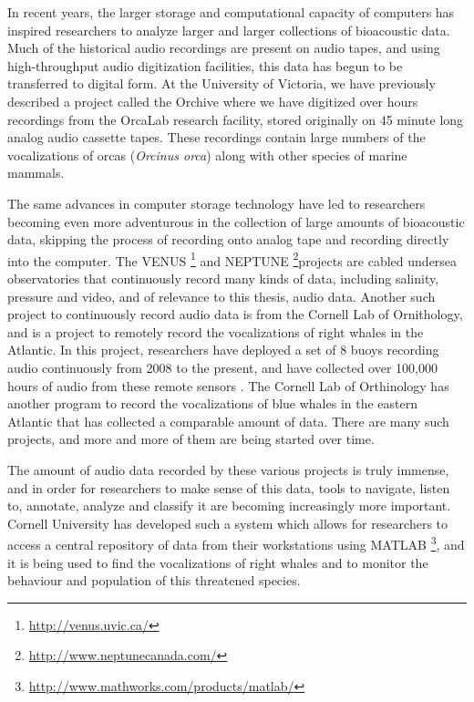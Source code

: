 \documentclass[12pt,oneside]{book}
\begin{document}
In recent years, the larger storage and computational capacity of
computers has inspired researchers to analyze larger and larger
collections of bioacoustic data.  Much of the historical audio
recordings are present on audio tapes, and using high-throughput audio
digitization facilities, this data has begun to be transferred to
digital form.  At the University of Victoria, we have previously
described a project called the Orchive \cite{ness2013orchive} where we
have digitized over \aboutNumberOfOrchiveRecordings hours recordings
from the OrcaLab research facility, stored originally on 45 minute
long analog audio cassette tapes.  These recordings contain large
numbers of the vocalizations of orcas (\textit{Orcinus orca}) along
with other species of marine mammals.

The same advances in computer storage technology have led to
researchers becoming even more adventurous in the collection of large
amounts of bioacoustic data, skipping the process of recording onto
analog tape and recording directly into the computer. The
VENUS \footnote{\url{http://venus.uvic.ca/}} and
NEPTUNE \footnote{\url{http://www.neptunecanada.com/}}projects are
cabled undersea observatories that continuously record many kinds of
data, including salinity, pressure and video, and of relevance to this
thesis, audio data.  Another such project to continuously record audio
data is from the Cornell Lab of Ornithology, and is a project to
remotely record the vocalizations of right whales in the Atlantic.  In
this project, researchers have deployed a set of 8 buoys recording
audio continuously from 2008 to the present, and have collected over
100,000 hours of audio from these remote sensors
\cite{urazghildiiev2009rightwhale}.  The Cornell Lab of Orthinology
has another program to record the vocalizations of blue whales in
the eastern Atlantic that has collected a comparable amount of data.
There are many such projects, and more and more of them are being
started over time.

The amount of audio data recorded by these various projects is truly
immense, and in order for researchers to make sense of this data,
tools to navigate, listen to, annotate, analyze and classify it are
becoming increasingly more important.  Cornell University has
developed such a system which allows for researchers to access a
central repository of data from their workstations using
MATLAB \footnote{\url{http://www.mathworks.com/products/matlab/}}, and
it is being used to find the vocalizations of right whales and to
monitor the behaviour and population of this threatened species.
\end{document}
